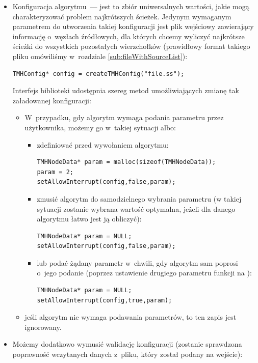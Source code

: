 \begin{itemize}
	\item Konfiguracja algorytmu~--- jest to zbiór uniwersalnych wartości, jakie mogą charakteryzować problem najkrótszych ścieżek.
	Jedynym wymaganym parametrem do utworzenia takiej konfiguracji jest plik wejściowy zawierający informację o~węzłach źródłowych, dla których chcemy wyliczyć najkrótsze ścieżki do wszystkich pozostałych wierzchołków (prawidłowy format takiego pliku omówiliśmy w~rozdziale \ref{sub:fileWithSourceList}):
	\begin{lstlisting}[style=customc]
TMHConfig* config = createTMHConfig("file.ss");
	\end{lstlisting}
	Interfejs biblioteki udostępnia szereg metod umożliwiających zmianę tak załadowanej konfiguracji:
	\begin{itemize}
		\item W~przypadku, gdy algorytm wymaga podania parametru przez użytkownika, możemy go w~takiej sytuacji albo:
		\begin{itemize}
			\item zdefiniować przed wywołaniem algorytmu:
			\begin{lstlisting}[style=customc]
TMHNodeData* param = malloc(sizeof(TMHNodeData));
param = 2;
setAllowInterrupt(config,false,param);
			\end{lstlisting}
			\item zmusić algorytm do samodzielnego wybrania parametru (w takiej sytuacji zostanie wybrana wartość optymalna, jeżeli dla danego algorytmu łatwo jest ją obliczyć):
			\begin{lstlisting}[style=customc]
TMHNodeData* param = NULL;
setAllowInterrupt(config,false,param);
			\end{lstlisting}
			\item lub podać żądany parametr w~chwili, gdy algorytm sam poprosi o~jego podanie (poprzez ustawienie drugiego parametru funkcji na \KwTrue):
			\begin{lstlisting}[style=customc]
TMHNodeData* param = NULL;
setAllowInterrupt(config,true,param);
			\end{lstlisting}
		\end{itemize}
	\item jeśli algorytm nie wymaga podawania parametrów, to ten zapis jest ignorowany. 
	\end{itemize}
	\item Możemy dodatkowo wymusić walidację konfiguracji (zostanie sprawdzona poprawność wczytanych danych z~pliku, który został podany na wejście):

\end{itemize}

